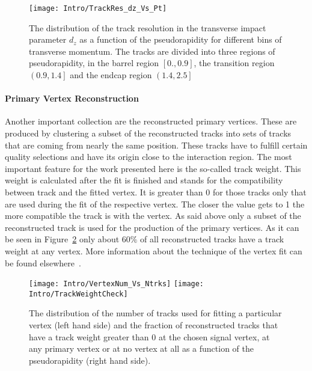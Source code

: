 \begin{figure}[!Hhtb]
    \centering
    \texttt{[image: Intro/TrackRes\_dz\_Vs\_Pt]}
    \caption[Track resolution \vs pseudo rapidity for different bins of transverse momentum]{The distribution of the track resolution in the transverse impact parameter $d_{z}$ as a function of the pseudorapidity for different bins of transverse momentum. The tracks are divided into three regions of pseudorapidity, in the barrel region $\left[0., 0.9\right]$, the transition region $\left(0.9, 1.4\right]$ and the endcap region $\left(1.4, 2.5\right]$\label{plot:IntroTrackRes}}
\end{figure}

\paragraph{Primary Vertex Reconstruction \label{sec:LHCCMSPVR}}

Another important collection are the reconstructed primary vertices. These are produced by clustering a subset of the reconstructed tracks into sets of tracks that are coming from nearly the same position. These tracks have to fulfill certain quality selections and have its origin close to the interaction region. The most important feature for the work presented here is the so-called track weight. This weight is calculated after the fit is finished and stands for the compatibility between track and the fitted vertex. It is greater than 0 for those tracks only that are used during the fit of the respective vertex. The closer the value gets to 1 the more compatible the track is with the vertex. As said above only a subset of the reconstructed track is used for the production of the primary vertices. As it can be seen in Figure~\ref{plot:IntroTrackWeight} only about $60\%$ of all reconstructed tracks have a track weight at any vertex.  More information about the technique of the vertex fit can be found elsewhere~\cite{CMS-PAPER-TRK-11-001}.

\begin{figure}[!Hhtb]
    \centering
    \texttt{[image: Intro/VertexNum\_Vs\_Ntrks]}
    \texttt{[image: Intro/TrackWeightCheck]}
    \caption[Distribution of number of tracks used for fitting the vertices and fraction of reconstructed tracks that have a track weight at any primary vertex]{The distribution of the number of tracks used for fitting a particular vertex (left hand side) and the fraction of reconstructed tracks that have a track weight greater than 0 at the chosen signal vertex, at any primary vertex or at no vertex at all as a function of the pseudorapidity (right hand side). \label{plot:IntroTrackWeight}}
\end{figure}

